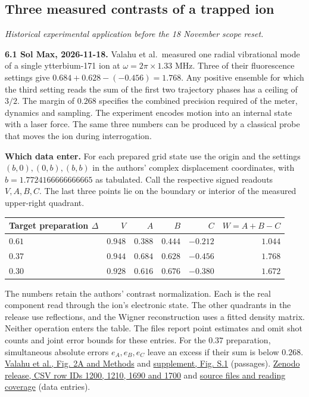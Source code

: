 \documentclass[11pt,a4paper]{article}
\begin{document}
\subsection{Three measured contrasts of a trapped
ion}\label{three-measured-contrasts-of-a-trapped-ion}

\emph{Historical experimental application before the 18 November scope
reset.}

\textbf{6.1 Sol Max, 2026-11-18.} Valahu et al.~measured one radial
vibrational mode of a single ytterbium-171 ion at
\(\omega=2\pi\times1.33\) MHz. Three of their fluorescence settings give
\(0.684+0.628-(-0.456)=1.768\). Any positive ensemble for which the
third setting reads the sum of the first two trajectory phases has a
ceiling of \(3/2\). The margin of \(0.268\) specifies the combined
precision required of the meter, dynamics and sampling. The experiment
encodes motion into an internal state with a laser force. The same three
numbers can be produced by a classical probe that moves the ion during
interrogation.

\textbf{Which data enter.} For each prepared grid state use the origin
and the settings \((b,0),(0,b),(b,b)\) in the authors' complex
displacement coordinates, with \(b=1.7724166666666665\) as tabulated.
Call the respective signed readouts \(V,A,B,C\). The last three points
lie on the boundary or interior of the measured upper-right quadrant.

\begin{longtable}[]{@{}lrrrrr@{}}
\toprule\noalign{}
Target preparation \(\Delta\) & \(V\) & \(A\) & \(B\) & \(C\) &
\(W=A+B-C\) \\
\midrule\noalign{}
\endhead
\bottomrule\noalign{}
\endlastfoot
\(0.61\) & \(0.948\) & \(0.388\) & \(0.444\) & \(-0.212\) & \(1.044\) \\
\(0.37\) & \(0.944\) & \(0.684\) & \(0.628\) & \(-0.456\) & \(1.768\) \\
\(0.30\) & \(0.928\) & \(0.616\) & \(0.676\) & \(-0.380\) & \(1.672\) \\
\end{longtable}

The numbers retain the authors' contrast normalization. Each is the real
component read through the ion's electronic state. The other quadrants
in the release use reflections, and the Wigner reconstruction uses a
fitted density matrix. Neither operation enters the table. The files
report point estimates and omit shot counts and joint error bounds for
these entries. For the \(0.37\) preparation, simultaneous absolute
errors \(e_A,e_B,e_C\) leave an excess if their sum is below \(0.268\).
\href{https://doi.org/10.1126/sciadv.adw9757}{Valahu et al., Fig. 2A and
Methods} and
\href{https://arxiv.org/pdf/2412.04865\#page=14}{supplement, Fig. S.1}
(passages). \href{https://zenodo.org/records/14512034}{Zenodo release,
CSV row IDs 1200, 1210, 1690 and 1700} and
\href{../docs/ValahuEtAl_GridContrast_2024.md}{source files and reading
coverage} (data entries).
\end{document}
